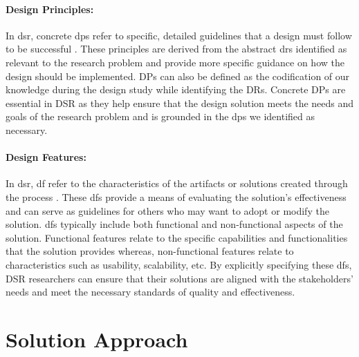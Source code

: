 \paragraph*{Design Principles:}
In \ac{dsr}, concrete \ac{dp}s refer to specific, detailed guidelines that a design must follow to be successful \cite{misc:dsr:webster}. 
These principles are derived from the abstract \ac{dr}s identified as relevant to the research problem and provide more specific guidance on how the design should be implemented.
DPs can also be defined as the codification of our knowledge during the design study while identifying the DRs. 
Concrete DPs are essential in DSR as they help ensure that the design solution meets the needs and goals of the research problem and is grounded in the \ac{dp}s we identified as necessary.

\paragraph{Design Features:}
In \ac{dsr}, \ac{df} refer to the characteristics of the artifacts or solutions created through the process \cite{misc:dsr:webster}. 
These \ac{df}s provide a means of evaluating the solution's effectiveness and can serve as guidelines for others who may want to adopt or modify the solution.
\ac{df}s typically include both functional and non-functional aspects of the solution. 
Functional features relate to the specific capabilities and functionalities that the solution provides whereas, non-functional features relate to characteristics such as usability, scalability, etc. 
By explicitly specifying these \ac{df}s, DSR researchers can ensure that their solutions are aligned with the stakeholders' needs and meet the necessary standards of quality and effectiveness.

\clearpage
\section{Solution Approach}
\label{introduction:section:solution}

